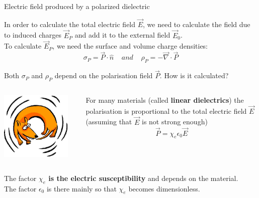 \begin{frame}{Electric field produced by a polarized dielectric}

In order to calculate the total electric field $\vec{E}$,
we need to calculate the field due to induced charges $\vec{E}_P$ and add it to the external field $\vec{E}_0$.\\

To calculate $\vec{E}_P$, we need the surface and volume charge densities:
\begin{equation*}
   {\sigma}_P = \vec{P} \cdot \hat{n} \;\;\;\; and \;\;\;\;
   {\rho}_P = - \vec{\nabla} \cdot \vec{P}
\end{equation*}

Both ${\sigma}_P$ and ${\rho}_P$ depend on the polarisation field $\vec{P}$.
How is it calculated?\\

\begin{columns}
  \begin{column}{0.25\textwidth}
   \begin{center}
     \includegraphics[width=0.90\textwidth]{./images/misc/dog_chasing_tail.jpg}\\
   \end{center}
  \end{column}
  \begin{column}{0.75\textwidth}
    For many materials (called {\bf linear dielectrics}) the polarisation is
    proportional to the total electric field $\vec{E}$ (assuming that $\vec{E}$ is not strong enough)
    \begin{equation*}
       \vec{P} = \chi_{e} \epsilon_0 \vec{E}
    \end{equation*}
  \end{column}
\end{columns}

The factor {\bf $\chi_{e}$ is the electric susceptibility} and depends on the material.\\
The factor $\epsilon_0$ is there mainly so that $\chi_{e}$ becomes dimensionless.\\

\end{frame}

